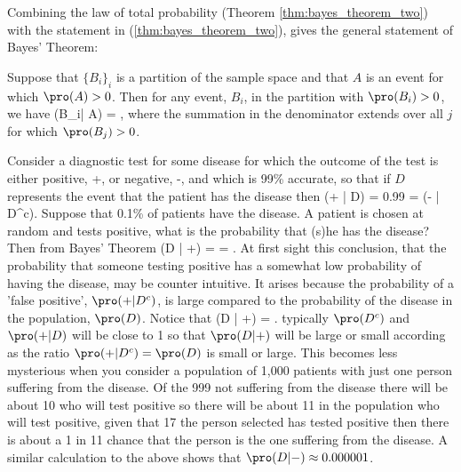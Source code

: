 Combining the law of total probability (Theorem \ref{thm:bayes_theorem_two})  with the statement in (\ref{thm:bayes_theorem_two}), gives the general statement of Bayes' Theorem:

\begin{theorem}\label{thm:bayes_theorem}
Suppose that $\{B_i\}_i$ is a partition of the sample space and that $A$ is an event for which $\pro(A) > 0$. Then for any event, $B_i$, in the partition with $\pro(B_i) > 0$, we have
\be
\pro(B_i| A) = ,
\ee
where the summation in the denominator extends over all $j$ for which $\pro(B_j) > 0$.
\end{theorem}



\begin{example}
Consider a diagnostic test for some disease for which the outcome of the test is either positive, +, or negative, -, and which is 99\% accurate, so that if $D$ represents the event that the patient has the disease then
\be
\pro (+ | D) = 0.99 = \pro (- | D^c).
\ee
Suppose that 0.1\% of patients have the disease. A patient is chosen at random and tests positive, what is the probability that (s)he has the disease? Then from Bayes' Theorem
\be
\pro(D | +) =  = .
\ee
At first sight this conclusion, that the probability that someone testing positive has a somewhat low probability of having the disease, may be counter intuitive. It arises because the probability of a 'false positive', $\pro (+ | D^c)$, is large compared to the probability of the disease in the population, $\pro(D)$. Notice that
\be
\pro(D | +) = .
\ee
typically $\pro(D^c)$ and $\pro(+ | D)$ will be close to 1 so that $\pro(D | +)$ will be large or small according as the ratio $\pro(+| D^c) =\pro (D)$ is small or large. This becomes less mysterious when you consider a population of 1,000 patients with just one person suffering from the disease. Of the 999 not suffering from the disease there will be about 10 who will test positive so there will be about 11 in the population who will test positive, given that
17 the person selected has tested positive then there is about a 1 in 11 chance that the person is the one suffering from the disease. A similar calculation to the above shows that $\pro(D |-) \approx 0.000001$.
\end{example}

